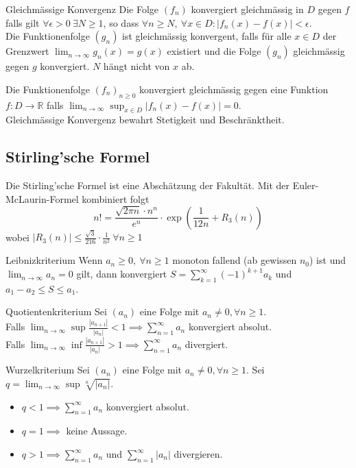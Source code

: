 \documentclass[a4paper,10pt]{article}
\def\limn{\lim_{n\to \infty}}
\def\sumk{\sum_{k=1}^\infty}
\begin{document}
 \begin{mainbox}{Gleichmässige Konvergenz}
  Die Folge $(f_n)$ konvergiert gleichmässig in $D$ gegen $f$ falls gilt $\forall \epsilon > 0 \ \exists N \ge 1$, so dass $\forall n \ge N, \ \forall x \in D: | f_n(x) - f(x) | < \epsilon$. \\
  Die Funktionenfolge $(g_n)$ ist gleichmässig konvergent, falls für alle $x\in D$ der Grenzwert $\limn g_n(x) = g(x)$ existiert und die Folge $(g_n)$ gleichmässig gegen $g$ konvergiert. $N$ hängt nicht von $x$ ab.
 \end{mainbox}
 
 Die Funktionenfolge $(f_n)_{n \geq 0}$ konvergiert gleichmässig gegen eine Funktion $f: D \rightarrow \mathbb{R}$ falls $\lim_{n \rightarrow \infty} \sup_{x \in D} |f_n(x) - f(x)| = 0$.\\
 
 Gleichmässige Konvergenz bewahrt Stetigkeit und Beschränktheit.
 
\subsection{Stirling'sche Formel}
Die Stirling'sche Formel ist eine Abschätzung der Fakultät. Mit der Euler-McLaurin-Formel kombiniert folgt
$$n! = \frac{\sqrt{2\pi n} \cdot n^n}{e^n} \cdot \exp(\frac{1}{12n}+R_3(n))$$
wobei $|R_3(n)| \le \frac{\sqrt{3}}{216}\cdot\frac{1}{n^2} \ \forall n \ge 1$

\begin{subbox}{Leibnizkriterium}
  Wenn $a_n \ge 0, \ \forall n \ge 1$ monoton fallend (ab gewissen $n_0$) ist und $\limn a_n = 0$ gilt, dann konvergiert $S = \sumk (-1)^{k+1} a_k$ und $a_1 - a_2 \le S \le a_1$.
  \end{subbox}
  
  \begin{mainbox}{Quotientenkriterium}
  Sei $(a_n)$ eine Folge mit $a_n \ne 0, \forall n \ge 1$. \\ Falls $\limn \sup \frac{|a_{n+1}|}{|a_n|} < 1 \implies \sum_{n=1}^\infty a_n$ konvergiert absolut. \\Falls $\limn \inf \frac{|a_{n+1}|}{|a_n|} > 1 \implies \sum_{n=1}^\infty a_n$ divergiert.  
  \end{mainbox}
  
  \begin{mainbox}{Wurzelkriterium}
  Sei $(a_n)$ eine Folge mit $a_n \ne 0, \forall n \ge 1$. Sei $q = \limn \sup \sqrt[n]{|a_n|}$. 
  \begin{itemize}
   \item $q < 1 \implies \sum_{n=1}^\infty a_n$ konvergiert absolut.
   \item $q = 1 \implies$ keine Aussage.
   \item $q > 1 \implies \sum_{n=1}^\infty a_n$ und $\sum_{n=1}^\infty |a_n|$ divergieren.
  \end{itemize}
\end{mainbox}
  
\end{document}
